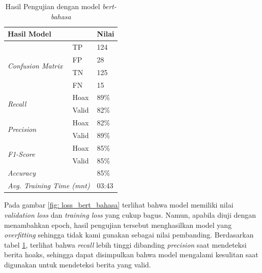 \begin{table}
    \caption{Hasil Pengujian dengan model \textit{bert-bahasa}}
    \label{tab: loss_bahasa}
    \centering
    \begin{tabular}{|l|l|l|}
        \hline
        \multicolumn{2}{|l|}{\textbf{Hasil Model}}              & \textbf{Nilai}        \\ \hline
        \multirow{4}{*}{\textit{Confusion Matrix}}              & TP             & 124  \\ \cline{2-3}
                                                                & FP             & 28   \\ \cline{2-3}
                                                                & TN             & 125  \\ \cline{2-3}
                                                                & FN             & 15   \\ \hline
        \multirow{2}{*}{\textit{Recall}}                        & Hoax           & 89\% \\ \cline{2-3}
                                                                & Valid          & 82\% \\ \hline
        \multirow{2}{*}{\textit{Precision}}                     & Hoax           & 82\% \\ \cline{2-3}
                                                                & Valid          & 89\% \\ \hline
        \multirow{2}{*}{\textit{F1-Score}}                      & Hoax           & 85\% \\ \cline{2-3}
                                                                & Valid          & 85\% \\ \hline
        \multicolumn{2}{|l|}{\textit{Accuracy}}                 & 85\%                  \\ \hline
        \multicolumn{2}{|l|}{\textit{Avg. Training Time (mnt)}} & 03:43                 \\ \hline
    \end{tabular}
\end{table}

Pada gambar \ref{fig: loss_bert_bahasa} terlihat bahwa model memiliki nilai \textit{validation loss} dan \textit{training loss} yang cukup bagus. Namun, apabila diuji dengan menambahkan epoch, hasil pengujian tersebut menghasilkan model yang \textit{overfitting} sehingga tidak kami gunakan sebagai nilai pembanding. Berdasarkan tabel \ref{tab: loss_bahasa}, terlihat bahwa \textit{recall} lebih tinggi dibanding \textit{precision} saat mendeteksi berita hoaks, sehingga dapat disimpulkan bahwa model mengalami kesulitan saat digunakan untuk mendeteksi berita yang valid.

